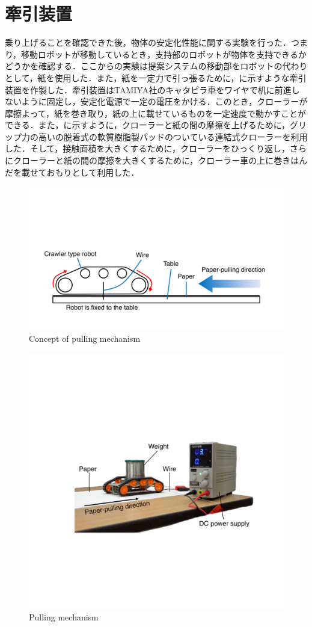 \section*{牽引装置}
乗り上げることを確認できた後，物体の安定化性能に関する実験を行った．つまり，移動ロボットが移動しているとき，支持部のロボットが物体を支持できるかどうかを確認する．ここからの実験は提案システムの移動部をロボットの代わりとして，紙を使用した．また，紙を一定力で引っ張るために，に示すような牽引装置を作製した．牽引装置はTAMIYA社のキャタピラ車をワイヤで机に前進しないように固定し，安定化電源で一定の電圧をかける．このとき，クローラーが摩擦よって，紙を巻き取り，紙の上に載せているものを一定速度で動かすことができる．また，に示すように，クローラーと紙の間の摩擦を上げるために，グリップ力の高いの脱着式の軟質樹脂製パッドのついている連結式クローラーを利用した．そして，接触面積を大きくするために，クローラーをひっくり返し，さらにクローラーと紙の間の摩擦を大きくするために，クローラー車の上に巻きはんだを載せておもりとして利用した．
\begin{figure}[b]
  \centering
  \includegraphics[width=0.75\columnwidth]{figure/concept-pulling-mechanism.pdf}
  \caption{Concept of pulling mechanism}
  \label{fig:pulling-mechanism-concept}
\end{figure}
\begin{figure}[tb]
  \centering
  \includegraphics[width=0.7\columnwidth]{figure/pulling-mechanism-v2.pdf}
  \caption{Pulling mechanism}
  \label{fig:pulling-mechanism}
\end{figure}

